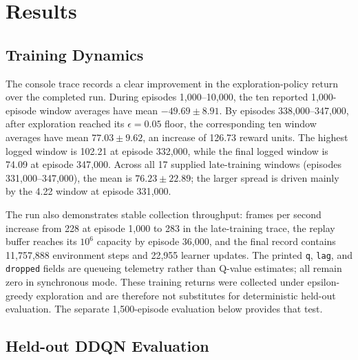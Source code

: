 \documentclass{article}
\begin{document}
\section{Results}
\label{sec:results}

\subsection{Training Dynamics}
\label{sec:training-results}

The console trace records a clear improvement in the exploration-policy
return over the completed run. During episodes 1{,}000--10{,}000, the ten
reported 1{,}000-episode window averages have mean $-49.69 \pm 8.91$. By
episodes 338{,}000--347{,}000, after exploration reached its
$\epsilon=0.05$ floor, the corresponding ten window averages have mean
$77.03 \pm 9.62$, an increase of 126.73 reward units. The highest logged
window is 102.21 at episode 332{,}000, while the final logged window is 74.09
at episode 347{,}000. Across all 17 supplied late-training windows
(episodes 331{,}000--347{,}000), the mean is $76.23 \pm 22.89$; the larger
spread is driven mainly by the 4.22 window at episode 331{,}000.

The run also demonstrates stable collection throughput: frames per second
increase from 228 at episode 1{,}000 to 283 in the late-training trace, the
replay buffer reaches its $10^6$ capacity by episode 36{,}000, and the final
record contains 11{,}757{,}888 environment steps and 22{,}955 learner updates.
The printed \texttt{q}, \texttt{lag}, and \texttt{dropped} fields are queueing
telemetry rather than Q-value estimates; all remain zero in synchronous mode.
These training returns were collected under epsilon-greedy exploration and
are therefore not substitutes for deterministic held-out evaluation. The
separate 1{,}500-episode evaluation below provides that test.

\subsection{Held-out DDQN Evaluation}

\begin{table}[t]
\centering
\caption{Held-out collision-avoidance performance for the evaluated DDQN
checkpoint (1{,}500 episodes). Continuous metrics are episode-level mean
$\pm$ standard deviation over 1{,}089 valid multi-step traces. Rate
intervals are reported in the text.}
\label{tab:main}
\end{table}
\end{document}
